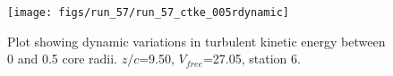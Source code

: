 \begin{figure}[H]
\centering
\texttt{[image: figs/run\_57/run\_57\_ctke\_005rdynamic]}
\caption{Plot showing dynamic variations in turbulent kinetic energy between 0 and 0.5 core radii. $z/c$=9.50, $V_{free}$=27.05, station 6.}
\label{fig:run_57_ctke_005rdynamic}
\end{figure}


